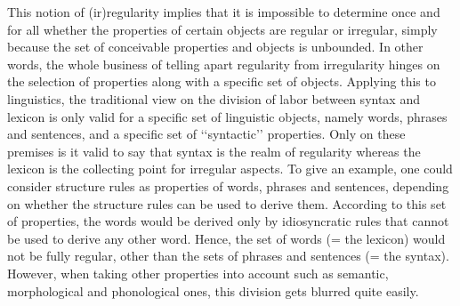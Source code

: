 \documentclass[output=paper
,modfonts
,nonflat
,biblatexbackend=biber
]{langsci/langscibook}
\begin{document}
\ili{}
This\ili{} notion\ili{} of\ili{} \ili{}(ir\ili{})regularity\ili{} implies\ili{} that\ili{} it\ili{} is\ili{} impossible\ili{} to\ili{} determine\ili{} once\ili{} and\ili{} for\ili{} all\ili{} whether\ili{} the\ili{} properties\ili{} of\ili{} certain\ili{} objects\ili{} are\ili{} regular\ili{} or\ili{} irregular\ili{},\ili{} simply\ili{} because\ili{} the\ili{} set\ili{} of\ili{} conceivable\ili{} properties\ili{} and\ili{} objects\ili{} is\ili{} unbounded\ili{}.\ili{} In\ili{} other\ili{} words\ili{},\ili{} the\ili{} whole\ili{} business\ili{} of\ili{} telling\ili{} apart\ili{} regularity\ili{} from\ili{} irregularity\ili{} hinges\ili{} on\ili{} the\ili{} selection\ili{} of\ili{} properties\ili{} along\ili{} with\ili{} a\ili{} specific\ili{} set\ili{} of\ili{} objects\ili{}.\ili{} \ili{}
\ili{}
Applying\ili{} this\ili{} to\ili{} linguistics\ili{},\ili{} the\ili{} traditional\ili{} view\ili{} on\ili{} the\ili{} division\ili{} of\ili{} labor\ili{} between\ili{} syntax\ili{} and\ili{} lexicon\ili{} is\ili{} only\ili{} valid\ili{} for\ili{} a\ili{} specific\ili{} set\ili{} of\ili{} linguistic\ili{} objects\ili{},\ili{} namely\ili{} words\ili{},\ili{} phrases\ili{} and\ili{} sentences\ili{},\ili{} and\ili{} a\ili{} specific\ili{} set\ili{} of\ili{} \ili{}`\ili{}`syntactic\ili{}'\ili{}'\ili{} properties\ili{}.\ili{} Only\ili{} on\ili{} these\ili{} premises\ili{} is\ili{} it\ili{} valid\ili{} to\ili{} say\ili{} that\ili{} syntax\ili{} is\ili{} the\ili{} realm\ili{} of\ili{} regularity\ili{} whereas\ili{} the\ili{} lexicon\ili{} is\ili{} the\ili{} collecting\ili{} point\ili{} for\ili{} \ili{} irregular\ili{} aspects\ili{}.\ili{} To\ili{} give\ili{} an\ili{} example\ili{},\ili{} one\ili{} could\ili{} consider\ili{} \ili{}\isi{}\ili{} structure\ili{} rules\ili{} as\ili{} properties\ili{} of\ili{} words\ili{},\ili{} phrases\ili{} and\ili{} sentences\ili{},\ili{} depending\ili{} on\ili{} whether\ili{} the\ili{} \ili{}\isi{}\ili{} structure\ili{} rules\ili{} can\ili{} be\ili{} used\ili{} to\ili{} derive\ili{} them\ili{}.\ili{} According\ili{} to\ili{} this\ili{} set\ili{} of\ili{} properties\ili{},\ili{} the\ili{} words\ili{} would\ili{} be\ili{} derived\ili{} only\ili{} by\ili{} idiosyncratic\ili{} rules\ili{} that\ili{} cannot\ili{} be\ili{} used\ili{} to\ili{} derive\ili{} any\ili{} other\ili{} word\ili{}.\ili{} Hence\ili{},\ili{} the\ili{} set\ili{} of\ili{} words\ili{} \ili{}(\ili{}=\ili{} the\ili{} lexicon\ili{})\ili{} would\ili{} not\ili{} be\ili{} fully\ili{} regular\ili{},\ili{} other\ili{} than\ili{} the\ili{} sets\ili{} of\ili{} phrases\ili{} and\ili{} sentences\ili{} \ili{}(\ili{}=\ili{} the\ili{} syntax\ili{})\ili{}.\ili{} However\ili{},\ili{} when\ili{} taking\ili{} other\ili{} properties\ili{} into\ili{} account\ili{} such\ili{} as\ili{} semantic\ili{},\ili{} morphological\ili{} and\ili{} phonological\ili{} ones\ili{},\ili{} this\ili{} division\ili{} gets\ili{} blurred\ili{} quite\ili{} easily\ili{}.\ili{}
\end{document}
